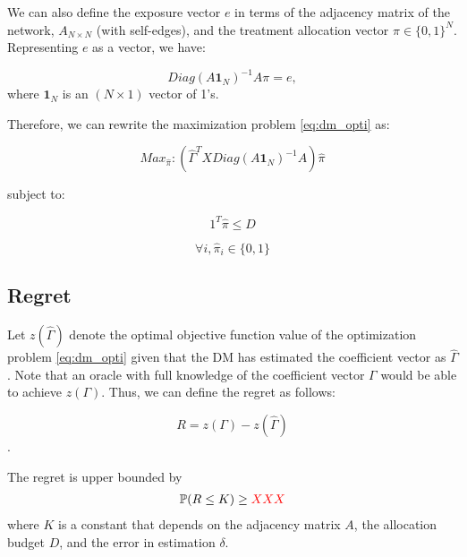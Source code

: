 \documentclass[12pt,a4paper]{article}
\begin{document}
We can also define the exposure vector $e$ in terms of the adjacency matrix of the network, $A_{N \times N}$ (with self-edges), and the treatment allocation vector $\pi \in \{0,1\}^N$.\\

Representing $e$ as a vector, we have: 

$$Diag(A \mathbf{1}_{N} ) ^{-1} A\pi  = e,$$
where $\mathbf{1}_{N}$ is an $(N \times 1)$ vector of 1's.

Therefore, we can rewrite the maximization problem \eqref{eq:dm_opti} as:

$$Max_{\hat \pi}: \left(\hat \Gamma^T X Diag(A \mathbf{1}_{N} ) ^{-1} A \right) \hat \pi  $$

subject to: 

$$1^T \hat \pi \leq D $$

$$\forall i, \hat \pi_i \in \{0,1\} $$


\iffalse
or, we can write: %

$$Max_{\hat \pi, y_i}: E \left( \left(\hat \Gamma^T X Diag(A \mathbf{1}_{N} ) ^{-1} A \right) \hat \pi  - \sum_{i \leq N} y_i \right)$$ subject to: 

$$\forall i,  \left( Diag(A \mathbf{1}_{N} ) ^{-1} A \hat \pi \right)_i \leq y_i$$

$$\forall i, y_i, \hat \pi_i \in \{0,1\} $$
\fi

\subsection{Regret}
Let $z(\hat \Gamma)$ denote the optimal objective function value of the optimization problem \eqref{eq:dm_opti} given that the DM has estimated the coefficient vector as $\hat{\Gamma} $. Note that an oracle with full knowledge of the coefficient vector $\Gamma$ would be able to achieve $z(\Gamma)$. Thus, we can define the regret as follows:

$$R = z(\Gamma) - z(\hat{\Gamma}) $$.

\begin{thm}
The regret is upper bounded by
\begin{align}
\mathbb{P}(R \leq K) \geq {\color{red} XXX}
\end{align}
where $K$ is a constant that depends on the adjacency matrix $A$, the allocation budget $D$, and the error in estimation $\delta$.
\end{thm}
\end{document}
